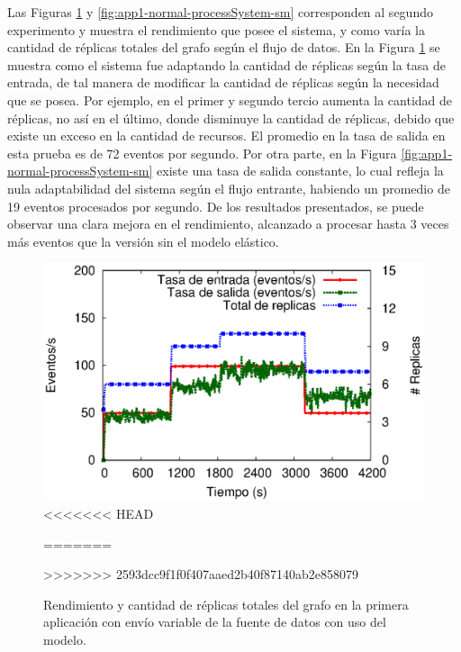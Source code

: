 Las Figuras \ref{fig:app1-normal-processSystem-cm} y \ref{fig:app1-normal-processSystem-sm} \normalsize{corresponden al segundo experimento y muestra el rendimiento que posee el sistema, y como var\'ia la cantidad de r\'eplicas totales del grafo seg\'un el flujo de datos.} En la Figura \ref{fig:app1-normal-processSystem-cm} \normalsize{se muestra como el sistema fue adaptando la cantidad de r\'eplicas seg\'un la tasa de entrada, de tal manera de modificar la cantidad de r\'eplicas seg\'un la necesidad que se posea. Por ejemplo, en el primer y segundo tercio aumenta la cantidad de r\'eplicas, no as\'i en el \'ultimo, donde disminuye la cantidad de r\'eplicas, debido que existe un exceso en la cantidad de recursos. El promedio en la tasa de salida en esta prueba es de 72 eventos por segundo.} Por otra parte, en la Figura \ref{fig:app1-normal-processSystem-sm} \normalsize{existe una tasa de salida constante, lo cual refleja la nula adaptabilidad del sistema seg\'un el flujo entrante, habiendo un promedio de 19 eventos procesados por segundo. De los resultados presentados, se puede observar una clara mejora en el rendimiento, alcanzado a procesar hasta 3 veces m\'as eventos que la versi\'on sin el modelo el\'astico.}

\begin{figure}[!ht]
	\centering
	\captionsetup{justification=centering}
	\includegraphics[scale=0.7]{images/exp/app1/normal/cm/processSystem.eps}
<<<<<<< HEAD
    \caption[Rendimiento y cantidad de réplicas totales del grafo en la primera aplicación con envío variable de la fuente de datos con uso del modelo.]{Rendimiento y cantidad de réplicas totales del grafo en la primera aplicación con envío variable de la fuente de datos con uso del modelo.\\Fuente: Elaboración propia.}
=======
    \caption{Rendimiento y cantidad de r\'eplicas totales del grafo en la primera aplicaci\'on con env\'io variable de la fuente de datos con uso del modelo.}
>>>>>>> 2593dcc9f1f0f407aaed2b40f87140ab2e858079
	\label{fig:app1-normal-processSystem-cm}
\end{figure}

